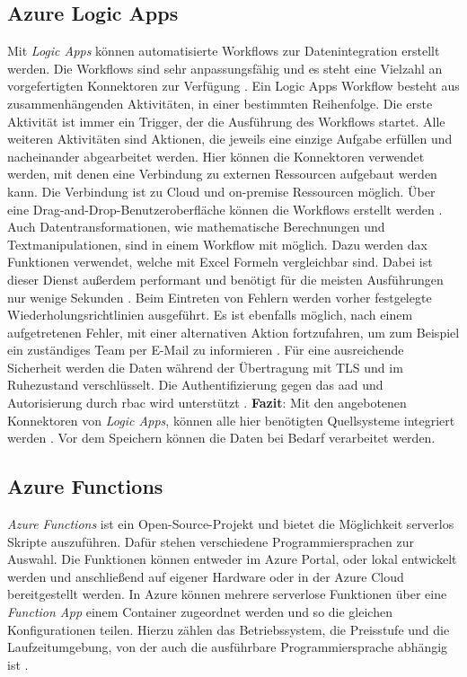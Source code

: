\subsection{Azure Logic Apps} \label{sec:grundlagen:azure_dienste:logicApps}
Mit \textit{Logic Apps} können automatisierte Workflows zur Datenintegration erstellt werden. Die Workflows sind sehr anpassungsfähig und es steht eine Vielzahl an vorgefertigten Konnektoren zur Verfügung \cite{kumar_serverless_2019}. Ein Logic Apps Workflow besteht aus zusammenhängenden Aktivitäten, in einer bestimmten Reihenfolge. Die erste Aktivität ist immer ein Trigger, der die Ausführung des Workflows startet. Alle weiteren Aktivitäten sind Aktionen, die jeweils eine einzige Aufgabe erfüllen und nacheinander abgearbeitet werden. Hier können die Konnektoren verwendet werden, mit denen eine Verbindung zu externen Ressourcen aufgebaut werden kann. Die Verbindung ist zu Cloud und on-premise Ressourcen möglich. Über eine Drag-and-Drop-Benutzeroberfläche können die Workflows erstellt werden \cite{modi_azure_2020}. Auch Datentransformationen, wie mathematische Berechnungen und Textmanipulationen, sind in einem Workflow mit möglich. Dazu werden \ac{dax} Funktionen verwendet, welche mit Excel Formeln vergleichbar sind. Dabei ist dieser Dienst außerdem performant und benötigt für die meisten Ausführungen nur wenige Sekunden \cite{bennett_enterprise_2021}. Beim Eintreten von Fehlern werden vorher festgelegte Wiederholungsrichtlinien ausgeführt. Es ist ebenfalls möglich, nach einem aufgetretenen Fehler, mit einer alternativen Aktion fortzufahren, um zum Beispiel ein zuständiges Team per E-Mail zu informieren \cite{msdoc_21_azureLogicAppsWorkflowsHandleErrors}. Für eine ausreichende Sicherheit werden die Daten während der Übertragung mit TLS und im Ruhezustand verschlüsselt. Die Authentifizierung gegen das \ac{aad} und Autorisierung durch \ac{rbac} wird unterstützt \cite{baldwin_azure_logicApps_2021}. 
\textbf{Fazit}: Mit den angebotenen Konnektoren von \textit{Logic Apps}, können alle hier benötigten Quellsysteme integriert werden \cite[vgl.][]{msdoc_21_azureLogicAppsConnectors}. Vor dem Speichern können die Daten bei Bedarf verarbeitet werden.


\subsection{Azure Functions} \label{sec:grundlagen:azure_dienste:functions}
\textit{Azure Functions} ist ein Open-Source-Projekt und bietet die Möglichkeit serverlos Skripte auszuführen. Dafür stehen verschiedene Programmiersprachen zur Auswahl. Die Funktionen können entweder im Azure Portal, oder lokal entwickelt werden und anschließend auf eigener Hardware oder in der Azure Cloud bereitgestellt werden. In Azure können mehrere serverlose Funktionen über eine \textit{Function App} einem Container zugeordnet werden und so die gleichen Konfigurationen teilen. Hierzu zählen das Betriebssystem, die Preisstufe und die Laufzeitumgebung, von der auch die ausführbare Programmiersprache abhängig ist \cite{kurniawan_practical_2019}.

